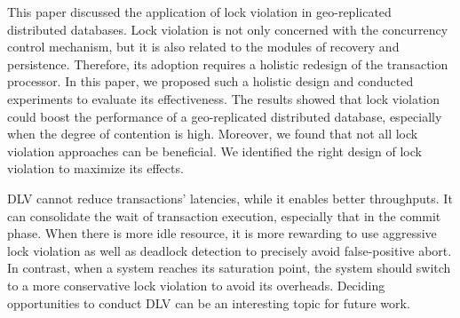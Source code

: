 \documentclass[conference]{IEEEtran}
\begin{document}
This paper discussed the application of lock violation in geo-replicated distributed databases.
Lock violation is not only concerned with the concurrency control mechanism, but it is also related to the modules of recovery and persistence.
Therefore, its adoption requires a holistic redesign of the transaction processor.
In this paper, we proposed such a holistic design and conducted experiments to evaluate its effectiveness.
The results showed that lock violation could boost the performance of a geo-replicated distributed database, especially when the degree of contention is high.
Moreover, we found that not all lock violation approaches can be beneficial. We identified the right design of lock violation to maximize its effects.

\begin{highlighted}

DLV cannot reduce transactions' latencies, while it enables better throughputs.
It can consolidate the wait of transaction execution, especially that in the commit phase.
When there is more idle resource, it is more rewarding to use aggressive lock violation as well as deadlock detection to precisely avoid false-positive abort.
In contrast, when a system reaches its saturation point, the system should switch to a more conservative
lock violation to avoid its overheads.
Deciding opportunities to conduct DLV can be an interesting topic for future work.


\end{highlighted}


\end{document}

